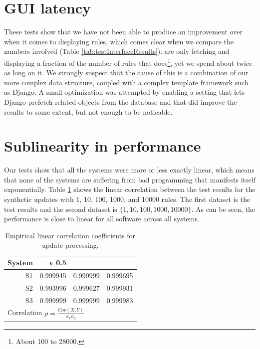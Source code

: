 \section{GUI latency}
These tests show that we have not been able to produce an improvement over
\bhtb{} when it comes to displaying rules, which comes clear when we compare the
numbers involved (Table \ref{tab:testInterfaceResults}).
\snowman{} are only fetching and displaying a fraction of the number of rules
that \bhtb{} does\footnote{About 100 to 28000.}, yet we spend about twice as
long on it. We strongly suspect that the cause of this is a combination of our
more complex data structure, coupled with a complex template framework such as
Django. A small optimization was attempted by enabling a setting that lets
Django prefetch related objects from the database and that did improve the
results to some extent, but not enough to be noticable.

\section{Sublinearity in performance}
Our tests show that all the systems were more or less exactly linear, which
means that none of the systems are suffering from bad programming that manifests
itself exponentially. Table \ref{tab:correlation} shows the linear correlation
between the test results for the synthetic updates with 1, 10, 100, 1000, and
10000 rules. The first dataset is the test results and the second dataset is
\(\{1,10,100,1000,10000\}\). As can be seen, the performance is close to linear
for all software across all systems.

\begin{table}[h!]
  \centering
  \begin{tabular}{r|r|r|r}
System & \snowman{} v 0.5 & \snortmanager{} & \bhtb{} \\
\hline
S1 & 0.999945 & 0.999999 & 0.999695 \\
S2 & 0.993996 & 0.999627 & 0.999931 \\
S3 & 0.999999 & 0.999999 & 0.999983 \\
	\hline
	\multicolumn{4}{l}{Correlation \(\rho = \frac{Cov(X,Y)}{\sigma_x \sigma_y} \)}
  \end{tabular}
  \caption{Empirical linear correlation coefficients for update processing.}
  \label{tab:correlation}
\end{table}

